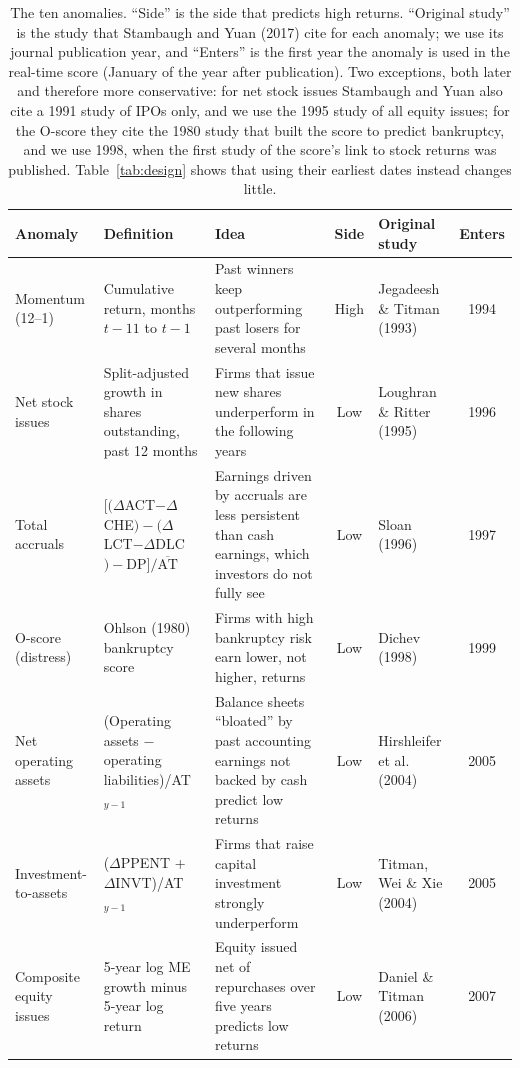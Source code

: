 \documentclass[12pt,a4paper]{article}
\begin{document}
\begin{singlespace}
\begin{table}[!htbp]\centering
\caption{The ten anomalies. ``Side'' is the side that predicts high returns. ``Original study'' is the study that Stambaugh and Yuan (2017) cite for each anomaly; we use its journal publication year, and ``Enters'' is the first year the anomaly is used in the real-time score (January of the year after publication). Two exceptions, both later and therefore more conservative: for net stock issues Stambaugh and Yuan also cite a 1991 study of IPOs only, and we use the 1995 study of all equity issues; for the O-score they cite the 1980 study that built the score to predict bankruptcy, and we use 1998, when the first study of the score's link to stock returns was published. Table~\ref{tab:design} shows that using their earliest dates instead changes little.}\label{tab:anomalies}
\scriptsize
\setlength{\tabcolsep}{3pt}\begin{tabular}{L{2.2cm}L{3.9cm}L{4.4cm}cL{2.4cm}c}\toprule
Anomaly & Definition & Idea & Side & Original study & Enters\\\midrule
Momentum (12--1) & Cumulative return, months $t-11$ to $t-1$ & Past winners keep outperforming past losers for several months & High & Jegadeesh \& Titman (1993) & 1994\\
Net stock issues & Split-adjusted growth in shares outstanding, past 12 months & Firms that issue new shares underperform in the following years & Low & Loughran \& Ritter (1995) & 1996\\
Total accruals & $[(\Delta$ACT$-\Delta$CHE$)-(\Delta$LCT$-\Delta$DLC$)-$DP$]/\overline{\text{AT}}$ & Earnings driven by accruals are less persistent than cash earnings, which investors do not fully see & Low & Sloan (1996) & 1997\\
O-score (distress) & Ohlson (1980) bankruptcy score & Firms with high bankruptcy risk earn lower, not higher, returns & Low & Dichev (1998) & 1999\\
Net operating assets & (Operating assets $-$ operating liabilities)/AT$_{y-1}$ & Balance sheets ``bloated'' by past accounting earnings not backed by cash predict low returns & Low & Hirshleifer et al. (2004) & 2005\\
Investment-to-assets & ($\Delta$PPENT + $\Delta$INVT)/AT$_{y-1}$ & Firms that raise capital investment strongly underperform & Low & Titman, Wei \& Xie (2004) & 2005\\
Composite equity issues & 5-year log ME growth minus 5-year log return & Equity issued net of repurchases over five years predicts low returns & Low & Daniel \& Titman (2006) & 2007\\

\end{tabular}
\end{table}
\end{singlespace}
\end{document}
